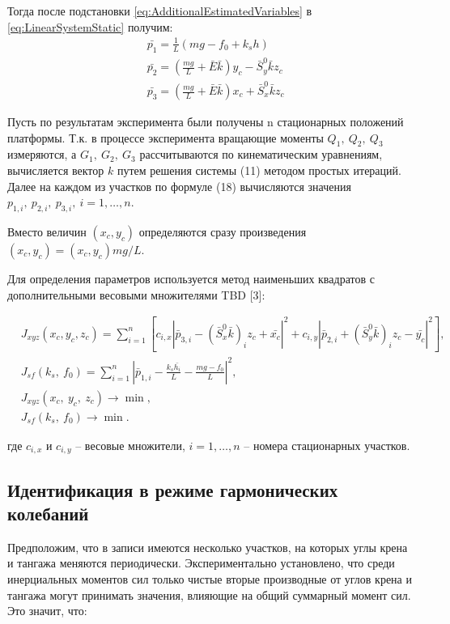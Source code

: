 Тогда после подстановки \ref{eq:AdditionalEstimatedVariables} в \ref{eq:LinearSystemStatic} получим:
\begin{equation}
\label{eq:AdditionalParamsRightPart}
\begin{aligned}
& \bar{p_1} = \frac{1}{L}\left(mg - f_0 + k_sh\right)\\
& \bar{p_2} = \left(\frac{mg}{L}+\bar{E}\bar{k}\right)y_c - \bar{S}^0_y\bar{k}z_c \\
& \bar{p_3} = \left(\frac{mg}{L}+\bar{E}\bar{k}\right)x_c + \bar{S}^0_x\bar{k}z_c
\end{aligned}
\end{equation}

Пусть по результатам эксперимента были получены n стационарных положений платформы. Т.к. в процессе эксперимента вращающие моменты $Q_1,~Q_2,~Q_3$ измеряются, а $G_1,~G_2,~G_3$ рассчитываются по кинематическим уравнениям, вычисляется вектор $k$ путем решения системы (11) методом простых итераций. Далее на каждом из участков по формуле (18) вычисляются значения  $p_{1,i},~p_{2,i},~p_{3,i},~i = 1,\dots,n$.

Вместо величин $\left(x_c, y_c\right)$ определяются сразу произведения $\left(x_c, y_c\right) = \left(x_c, y_c\right) mg/L$.

Для определения параметров используется метод наименьших квадратов с дополнительными весовыми множителями TBD [3]:

\begin{equation}
\label{eq:LeastSquareMethodFormulation}
\begin{aligned}
& J_{xyz}\left(x_c,y_c,z_c\right)=\sum_{i=1}^n\left[
c_{i,x}\left|\bar{p}_{3,i}-\left(\bar{S}_x^0\bar{k}\right)_iz_c + \bar{x_c}\right|^2 + c_{i,y}\left|\bar{p}_{2,i}+\left(\bar{S}_y^0\bar{k}\right)_iz_c - \bar{y_c}\right|^2\right], \\
& J_{sf}\left(k_s,~f_0\right)=\sum_{i=1}^n{\left|\bar{p}_{1,i}-\frac{k_s\bar{h_i}}{L}-\frac{mg-f_0}{L}\right|}^2, \\
& J_{xyz}\left(x_c,~y_c,~z_c\right)\rightarrow\min, \\
& J_{sf}\left(k_s,~f_0\right)\rightarrow\min.
\end{aligned}
\end{equation}

где $c_{i,x}$ и $c_{i,y}$  – весовые множители, $i = 1,\dots,n$ – номера стационарных участков.

\subsection{Идентификация в режиме гармонических колебаний}
Предположим, что в записи имеются несколько участков, на которых углы крена и тангажа меняются периодически. Экспериментально установлено, что среди инерциальных моментов сил только чистые вторые производные от углов крена и тангажа могут принимать значения, влияющие на общий суммарный момент сил. Это значит, что:

